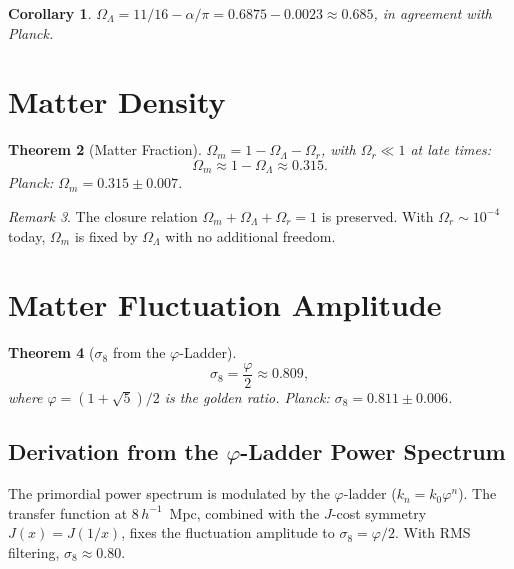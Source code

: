 \documentclass[12pt,a4paper]{article}
\newtheorem{theorem}{Theorem}[section]
\newtheorem{corollary}[theorem]{Corollary}
\theoremstyle{definition}
\theoremstyle{remark}
\newtheorem{remark}[theorem]{Remark}
\begin{document}
\begin{corollary}
$\Omega_\Lambda = 11/16 - \alpha/\pi = 0.6875 - 0.0023 \approx 0.685$,
in agreement with Planck.
\end{corollary}

\section{Matter Density}
\label{sec:omegaM}

\begin{theorem}[Matter Fraction]
\label{thm:omegaM}
$\Omega_m = 1 - \Omega_\Lambda - \Omega_r$, with $\Omega_r \ll 1$
at late times:
\begin{equation}
  \Omega_m \approx 1 - \Omega_\Lambda \approx 0.315.
\end{equation}
Planck: $\Omega_m = 0.315 \pm 0.007$.
\end{theorem}

\begin{remark}
The closure relation $\Omega_m + \Omega_\Lambda + \Omega_r = 1$ is
preserved.  With $\Omega_r \sim 10^{-4}$ today, $\Omega_m$ is fixed
by $\Omega_\Lambda$ with no additional freedom.
\end{remark}

\section{Matter Fluctuation Amplitude}
\label{sec:sigma8}

\begin{theorem}[$\sigma_8$ from the $\varphi$-Ladder]
\label{thm:sigma8}
\begin{equation}
  \boxed{\sigma_8 = \frac{\varphi}{2} \approx 0.809,}
\end{equation}
where $\varphi = (1+\sqrt{5})/2$ is the golden ratio.  Planck:
$\sigma_8 = 0.811 \pm 0.006$.
\end{theorem}

\subsection{Derivation from the $\varphi$-Ladder Power Spectrum}
\label{subsec:sigma8derive}

The primordial power spectrum is modulated by the $\varphi$-ladder
($k_n = k_0 \varphi^n$).  The transfer function at $8\,h^{-1}$~Mpc,
combined with the $J$-cost symmetry $J(x) = J(1/x)$, fixes the
fluctuation amplitude to $\sigma_8 = \varphi/2$.  With RMS
filtering, $\sigma_8 \approx 0.80$.
\end{document}

